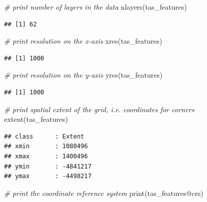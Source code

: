 \documentclass[
  12pt,
]{book}
\newenvironment{Shaded}{\begin{snugshade}}{\end{snugshade}}
\newcommand{\CommentTok}[1]{\textcolor[rgb]{0.56,0.35,0.01}{\textit{#1}}}
\newcommand{\FunctionTok}[1]{\textcolor[rgb]{0.00,0.00,0.00}{#1}}
\newcommand{\NormalTok}[1]{#1}
\newcommand{\SpecialCharTok}[1]{\textcolor[rgb]{0.00,0.00,0.00}{#1}}
\begin{document}
\begin{Shaded}
\begin{Highlighting}[]
\CommentTok{\# print number of layers in the data}
\FunctionTok{nlayers}\NormalTok{(tas\_features)}
\end{Highlighting}
\end{Shaded}

\begin{verbatim}
## [1] 62
\end{verbatim}

\begin{Shaded}
\begin{Highlighting}[]
\CommentTok{\# print  resolution on the x{-}axis}
\FunctionTok{xres}\NormalTok{(tas\_features)}
\end{Highlighting}
\end{Shaded}

\begin{verbatim}
## [1] 1000
\end{verbatim}

\begin{Shaded}
\begin{Highlighting}[]
\CommentTok{\# print resolution on the y{-}axis}
\FunctionTok{yres}\NormalTok{(tas\_features)}
\end{Highlighting}
\end{Shaded}

\begin{verbatim}
## [1] 1000
\end{verbatim}

\begin{Shaded}
\begin{Highlighting}[]
\CommentTok{\# print spatial extent of the grid, i.e. coordinates for corners}
\FunctionTok{extent}\NormalTok{(tas\_features)}
\end{Highlighting}
\end{Shaded}

\begin{verbatim}
## class      : Extent 
## xmin       : 1080496 
## xmax       : 1400496 
## ymin       : -4841217 
## ymax       : -4498217
\end{verbatim}

\begin{Shaded}
\begin{Highlighting}[]
\CommentTok{\# print the coordinate reference system}
\FunctionTok{print}\NormalTok{(tas\_features}\SpecialCharTok{@}\NormalTok{crs)}
\end{Highlighting}
\end{Shaded}
\end{document}
